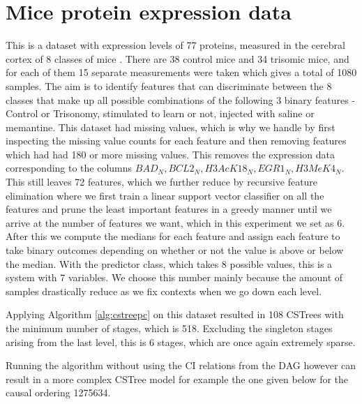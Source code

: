\documentclass{tufte-book}
\begin{document}
\section{Mice protein expression data}
\label{sec:orgf88f513}
This is a dataset with expression levels of 77 proteins, measured in the cerebral cortex of 8 classes of mice \cite{higuera-2015-self-organ}. There are 38 control mice and 34 trisomic mice, and for each of them 15 separate measurements were taken which gives a total of 1080 samples. The aim is to identify features that can discriminate between the 8 classes that make up all possible combinations of the following 3 binary features - Control or Trisonomy, stimulated to learn or not, injected with saline or memantine. This dataset had missing values, which is why we handle by first inspecting the missing value counts for each feature and then removing features which had had 180 or more missing values. This removes the expression data corresponding to the columns \(BAD_N, BCL2_N, H3AcK18_N, EGR1_N, H3MeK4_N\). This still leaves 72 features, which we further reduce by recursive feature elimination \cite{guyon-2002} where we first train a linear support vector classifier on all the features and prune the least important features in a greedy manner until we arrive at the number of features we want, which in this experiment we set as 6. After this we compute the medians for each feature and assign each feature to take binary outcomes depending on whether or not the value is above or below the median. With the predictor class, which takes 8 possible values, this is a system with 7 variables. We choose this number mainly because the amount of samples drastically reduce as we fix contexts when we go down each level.


Applying Algorithm \ref{alg:cstreepc} on this dataset resulted in 108 CSTrees with the minimum number of stages, which is 518. Excluding the singleton stages arising from the last level, this is 6 stages, which are once again extremely sparse.


Running the algorithm without using the CI relations from the DAG however can result in a more complex CSTree model for example the one given below for the causal ordering 1275634.
\end{document}
